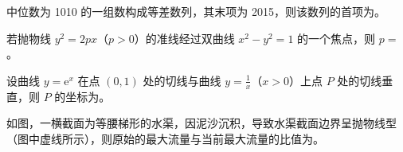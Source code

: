 \begin{question}

中位数为 1010 的一组数构成等差数列，其末项为 2015，则该数列的首项为\gkblank{}。

\end{question}
\begin{question}

若抛物线 $y^2=2px$（$p>0$）的准线经过双曲线 $x^2-y^2=1$ 的一个焦点，则 $p=$\gkblank{}。

\end{question}
\begin{question}

设曲线 $y=\mathrm e^x$ 在点 $(0,1)$ 处的切线与曲线 $y=\frac1x$（$x>0$）上点 $P$ 处的切线垂直，则 $P$ 的坐标为\gkblank{}。

\Needspace{0.4\textheight}
\end{question}
\begin{question}

如图，一横截面为等腰梯形的水渠，因泥沙沉积，导致水渠截面边界呈抛物线型（图中虚线所示），则原始的最大流量与当前最大流量的比值为\gkblank{}。
\nopagebreak[4]
\begin{center}\end{center}
\nopagebreak[4]
\end{question}

